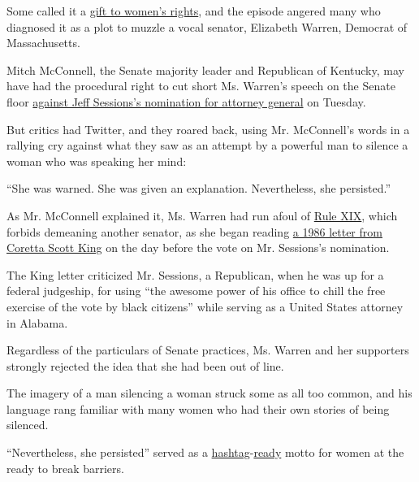 Some called it a
\href{https://www.nytimes.com/2017/02/08/us/politics/elizabeth-warren-coretta-scott-king.html?hp\&action=click\&pgtype=Homepage\&clickSource=story-heading\&module=a-lede-package-region\&region=top-news\&WT.nav=top-news}{gift
to women's rights}, and the episode angered many who diagnosed it as a
plot to muzzle a vocal senator, Elizabeth Warren, Democrat of
Massachusetts.

Mitch McConnell, the Senate majority leader and Republican of Kentucky,
may have had the procedural right to cut short Ms. Warren's speech on
the Senate floor
\href{https://www.nytimes.com/2017/02/07/us/politics/republican-senators-vote-to-formally-silence-elizabeth-warren.html}{against
Jeff Sessions's nomination for attorney general} on Tuesday.

But critics had Twitter, and they roared back, using Mr. McConnell's
words in a rallying cry against what they saw as an attempt by a
powerful man to silence a woman who was speaking her mind:

``She was warned. She was given an explanation. Nevertheless, she
persisted.''

As Mr. McConnell explained it, Ms. Warren had run afoul of
\href{http://www.rules.senate.gov/public/index.cfm?p=RuleXIX}{Rule XIX},
which forbids demeaning another senator, as she began reading
\href{https://www.nytimes.com/2017/02/08/us/politics/elizabeth-warren-coretta-scott-king-jeff-sessions.html?hp\&action=click\&pgtype=Homepage\&clickSource=story-heading\&module=a-lede-package-region\&region=top-news\&WT.nav=top-news}{a
1986 letter from Coretta Scott King} on the day before the vote on Mr.
Sessions's nomination.

The King letter criticized Mr. Sessions, a Republican, when he was up
for a federal judgeship, for using ``the awesome power of his office to
chill the free exercise of the vote by black citizens'' while serving as
a United States attorney in Alabama.

Regardless of the particulars of Senate practices, Ms. Warren and her
supporters strongly rejected the idea that she had been out of line.

The imagery of a man silencing a woman struck some as all too common,
and his language rang familiar with many women who had their own stories
of being silenced.

``Nevertheless, she persisted'' served as a
\href{https://twitter.com/search?q=\%23ShePersisted\&src=typd}{hashtag}-\href{https://twitter.com/search?q=\%23letlizspeak\&src=tyah}{ready}
motto for women at the ready to break barriers.

